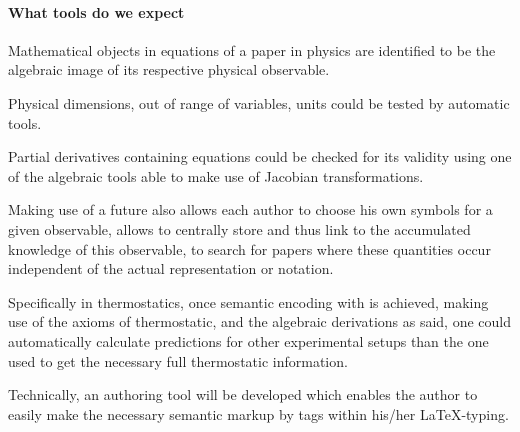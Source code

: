 \paragraph{What tools do we expect}
Mathematical objects in equations of a paper in physics are identified to
be the algebraic image of its respective physical observable.

Physical dimensions, out of range of variables, units could be tested by automatic tools.

Partial derivatives containing equations could be checked for its validity
using one of the algebraic tools able to make use of Jacobian transformations.

Making use of a future {\physml} also allows each author to choose his own symbols
for a given observable, allows to centrally store and thus link to the
accumulated knowledge of this observable, to search for papers where these
quantities occur independent of the actual representation or notation.

Specifically in thermostatics, once semantic encoding with {\physml} is  achieved,
making use of the axioms of thermostatic, and the algebraic derivations as said,
one  could automatically calculate predictions for other experimental setups
than the one used to get the necessary full thermostatic information.

Technically, an authoring tool will be developed which enables the author to easily make
the necessary semantic markup by tags within his/her {\LaTeX}-typing.


